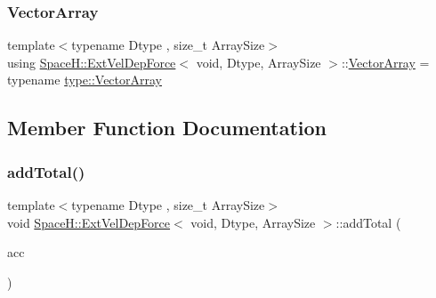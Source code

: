 \mbox{\label{struct_space_h_1_1_ext_vel_dep_force_3_01void_00_01_dtype_00_01_array_size_01_4_a606b1df4989b62f06775a825c0f8e483}} 
\subsubsection{\texorpdfstring{Vector\+Array}{VectorArray}}
{\footnotesize\ttfamily template$<$typename Dtype , size\+\_\+t Array\+Size$>$ \\
using \mbox{\hyperlink{struct_space_h_1_1_ext_vel_dep_force}{Space\+H\+::\+Ext\+Vel\+Dep\+Force}}$<$ void, Dtype, Array\+Size $>$\+::\mbox{\hyperlink{struct_space_h_1_1_ext_vel_dep_force_3_01void_00_01_dtype_00_01_array_size_01_4_a606b1df4989b62f06775a825c0f8e483}{Vector\+Array}} =  typename \mbox{\hyperlink{struct_space_h_1_1_proto_type_a622b8e122b33bb4966a02299fb7b82d6}{type\+::\+Vector\+Array}}}



\subsection{Member Function Documentation}
\mbox{\label{struct_space_h_1_1_ext_vel_dep_force_3_01void_00_01_dtype_00_01_array_size_01_4_ace1007ee6131097df834217979940cbb}} 
\subsubsection{\texorpdfstring{add\+Total()}{addTotal()}}
{\footnotesize\ttfamily template$<$typename Dtype , size\+\_\+t Array\+Size$>$ \\
void \mbox{\hyperlink{struct_space_h_1_1_ext_vel_dep_force}{Space\+H\+::\+Ext\+Vel\+Dep\+Force}}$<$ void, Dtype, Array\+Size $>$\+::add\+Total (\begin{DoxyParamCaption}\item[{\mbox{\hyperlink{struct_space_h_1_1_ext_vel_dep_force_3_01void_00_01_dtype_00_01_array_size_01_4_a606b1df4989b62f06775a825c0f8e483}{Vector\+Array}} \&}]{acc }\end{DoxyParamCaption})\hspace{0.3cm}{\ttfamily [inline]}}


